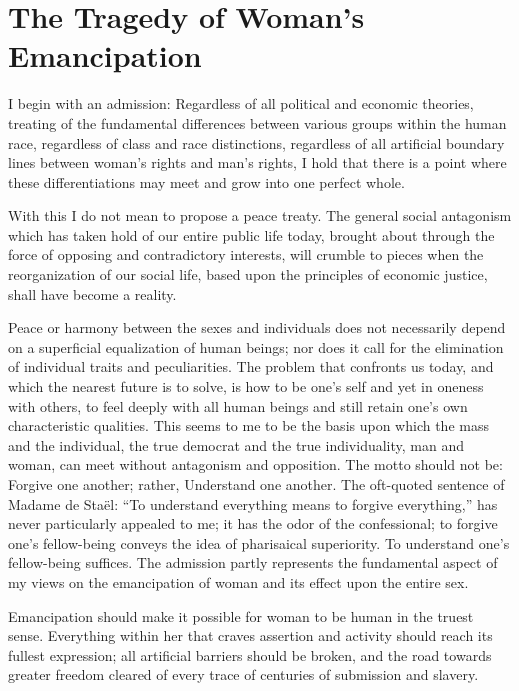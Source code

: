 
\author{Emma Goldman}
\chapter{The Tragedy of Woman's Emancipation}


\noindent I begin with an admission: Regardless of all
political and economic theories, treating of the fundamental
differences between various groups within the human race, regardless
of class and race distinctions, regardless of all artificial boundary
lines between woman's rights and man's rights, I hold that there is a
point where these differentiations may meet and grow into one perfect
whole.

With this I do not mean to propose a peace treaty. The general social
antagonism which has taken hold of our entire public life today,
brought about through the force of opposing and contradictory
interests, will crumble to pieces when the reorganization of our
social life, based upon the principles of economic justice, shall have
become a reality.

Peace or harmony between the sexes and individuals does not
necessarily depend on a superficial equalization of human beings; nor
does it call for the elimination of individual traits and
peculiarities. The problem that confronts us today, and which the
nearest future is to solve, is how to be one's self and yet 
in oneness with others, to feel deeply with all human beings and still
retain one's own characteristic qualities. This seems to me to be the
basis upon which the mass and the individual, the true democrat and
the true individuality, man and woman, can meet without antagonism and
opposition. The motto should not be: Forgive one another; rather,
Understand one another. The oft-quoted sentence of Madame de
Sta\"{e}l:  ``To understand everything means to forgive everything,''
has never particularly appealed to me; it has the odor of the
confessional; to forgive one's fellow-being conveys the idea of
pharisaical superiority. To understand one's fellow-being suffices.
The admission partly represents the fundamental aspect of my views on
the emancipation of woman and its effect upon the entire sex.

Emancipation should make it possible for woman to be human in the
truest sense. Everything within her that craves assertion and activity
should reach its fullest expression; all artificial barriers should be
broken, and the road towards greater freedom cleared of every trace of
centuries of submission and slavery.

